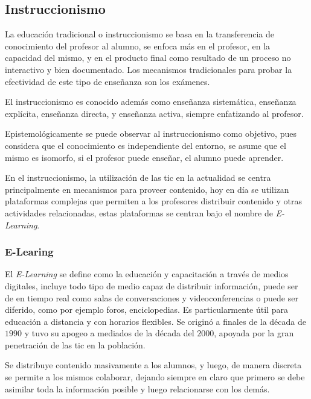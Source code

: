 \subsection{Instruccionismo}

La educación tradicional o instruccionismo se basa en la transferencia de
conocimiento del profesor al alumno, se enfoca más en el profesor, en la
capacidad del mismo, y en el producto final como resultado de un proceso no
interactivo y bien
documentado\cite{igi:instructionism,johnson2005instructionism}. Los mecanismos
tradicionales para probar la efectividad de este tipo de enseñanza son los
exámenes.

El instruccionismo es conocido además como enseñanza sistemática, enseñanza
explícita, enseñanza directa, y enseñanza activa, siempre enfatizando al
profesor\cite{johnson2005instructionism}.

Epistemológicamente se puede observar al instruccionismo como objetivo, pues
considera que el conocimiento es independiente del entorno, se asume que el
mismo es isomorfo, si el profesor puede enseñar, el alumno puede
aprender\cite{johnson2005instructionism}.

En el instruccionismo, la utilización de las \Gls{tic} en la actualidad se
centra principalmente en mecanismos para proveer contenido, hoy en día se
utilizan plataformas complejas que permiten a los profesores distribuir
contenido y otras actividades relacionadas, estas plataformas se centran bajo
el nombre de \emph{E-Learning}.


\subsubsection{E-Learing} 

El \emph{E-Learning} se define como la educación y capacitación a través de
medios digitales, incluye todo tipo de medio capaz de distribuir información,
puede ser de en tiempo real como salas de conversaciones y videoconferencias o
puede ser diferido, como por ejemplo foros, enciclopedias. Es particularmente
útil para educación a distancia y con horarios flexibles. Se originó a finales
de la década de $1990$ y tuvo su apogeo a mediados de la década del $2000$,
apoyada por la gran penetración de las \Gls{tic} en la
población\cite{punie:ict}.

Se distribuye contenido masivamente a los alumnos, y luego, de manera discreta
se permite a los mismos colaborar, dejando siempre en claro que primero se debe
asimilar toda la información posible y luego relacionarse con los
demás\cite{leinonen:ict}.


